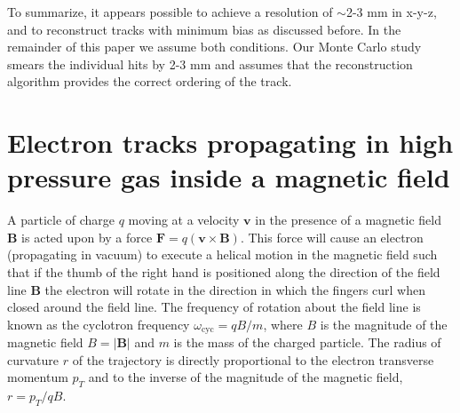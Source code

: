 \documentclass{JINST}
\begin{document}

To summarize, it appears possible to achieve a resolution of $\sim$2-3 mm in x-y-z, and to reconstruct tracks with minimum bias as discussed before. In the remainder of this paper we assume both conditions. Our Monte Carlo study smears the individual hits by 2-3 mm and assumes that the reconstruction algorithm provides the correct ordering of the track. 


\section{Electron tracks propagating in high pressure gas inside a magnetic field}\label{sec.magmotion}


A particle of charge $q$ moving at a velocity $\mathbf{v}$ in the presence of a magnetic field $\mathbf{B}$ is acted upon by a force
%
$\mathbf{F} = q(\mathbf{v} \times \mathbf{B})$.
%
This force will cause an electron (propagating in vacuum) to execute a helical motion in the magnetic field such that if the thumb of the right hand is positioned along the direction of the field line $\mathbf{B}$ the electron will rotate in the direction in which the fingers curl when closed around the field line.  The frequency of rotation about the field line is known as the cyclotron frequency $\omega_{\mathrm{cyc}} = qB/m$, where $B$ is the magnitude of the magnetic field $B = |\mathbf{B}|$ and $m$ is the mass of the charged particle. The radius of curvature $r$ of the trajectory is directly proportional to the electron transverse momentum $p_{T}$ and to the inverse of the magnitude of the magnetic field, $r = p_{T}/qB$.
\end{document}
